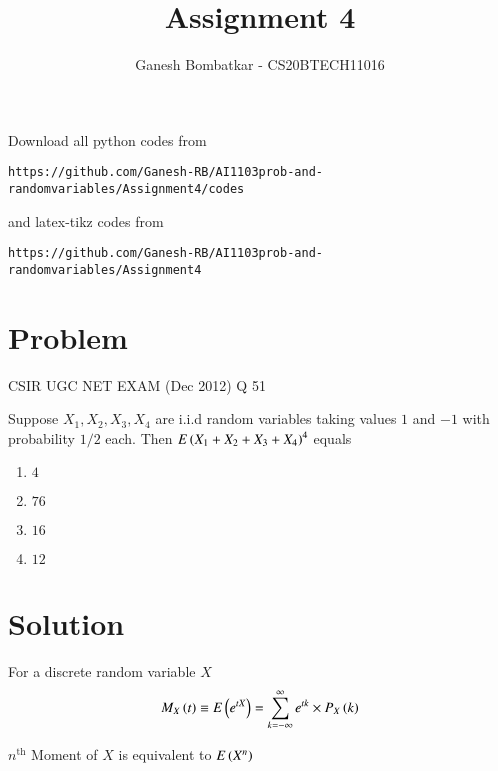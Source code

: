 \documentclass[journal,12pt,twocolumn]{IEEEtran}
\begin{document}
     \def\rightbox#1{\makebox[0in][r]{#1}}
     \def\centbox#1{\makebox[0in]{#1}}
     \def\topbox#1{\raisebox{-\baselineskip}[0in][0in]{#1}}
     \def\midbox#1{\raisebox{-0.5\baselineskip}[0in][0in]{#1}}
\vspace{3cm}
\title{Assignment 4}
\author{Ganesh Bombatkar - CS20BTECH11016}
\maketitle
\newpage
\bigskip
\renewcommand{\thefigure}{\theenumi}
\renewcommand{\thetable}{\theenumi}
Download all python codes from 
\begin{lstlisting}
https://github.com/Ganesh-RB/AI1103prob-and-randomvariables/Assignment4/codes
\end{lstlisting}
%
and latex-tikz codes from 
%
\begin{lstlisting}
https://github.com/Ganesh-RB/AI1103prob-and-randomvariables/Assignment4
\end{lstlisting}

\section{Problem}
{
\centering CSIR UGC NET EXAM (Dec 2012) Q 51

}
Suppose $X_1,X_2,X_3,X_4$ are i.i.d random variables taking values $1$ and $-1$ with probability $1/2$ each. Then $E\left(X_1+X_2 +X_3 +X_4\right)^4$ equals
\begin{multicols}{4}
\begin{enumerate}
    \item $4$
    \item $76$
    \item $16$
    \item $12$
\end{enumerate}
\end{multicols}

\section{Solution}
\begin{definition}
    For a discrete random variable $X$  
    \begin{align}
        M_{X}\left(t\right) \equiv E\left(e^{t X}\right) = \sum_{k=-\infty}^{\infty} e^{t k}\times P_X\left(k\right)
    \end{align}
\end{definition}

\begin{theorem}
$n^{\text{th}}$ Moment of $X$ is equivalent to $E\left(X^n\right)$
\label{nth-Moment-Theorem}
\end{theorem}
\end{document}
